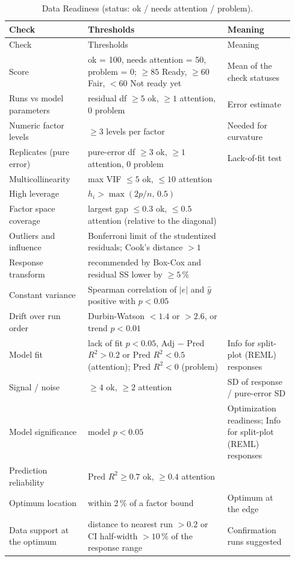 {\small\begin{longtable}{@{}p{0.26\linewidth}p{0.46\linewidth}p{0.22\linewidth}@{}}
\caption{Data Readiness (status: ok / needs attention / problem).}\label{tab:a-const-ready}\\
\toprule
Check & Thresholds & Meaning \\
\midrule
\endfirsthead
\toprule
Check & Thresholds & Meaning \\
\midrule
\endhead
\bottomrule
\endfoot
Score & ok = 100, needs attention = 50, problem = 0; $\ge 85$ Ready, $\ge 60$ Fair, $< 60$ Not ready yet & Mean of
  the check statuses \\
Runs vs model parameters & residual df $\ge 5$ ok, $\ge 1$ attention, 0 problem & Error estimate \\
Numeric factor levels & $\ge 3$ levels per factor & Needed for curvature \\
Replicates (pure error) & pure-error df $\ge 3$ ok, $\ge 1$ attention, 0 problem & Lack-of-fit test \\
Multicollinearity & max VIF $\le 5$ ok, $\le 10$ attention & \\
High leverage & $h_i > \max(2p/n,\,0.5)$ & \\
Factor space coverage & largest gap $\le 0.3$ ok, $\le 0.5$ attention (relative to the diagonal) & \\
Outliers and influence & Bonferroni limit of the studentized residuals; Cook's distance $> 1$ & \\
Response transform & recommended by Box-Cox and residual SS lower by $\ge 5\,\%$ & \\
Constant variance & Spearman correlation of $|e|$ and $\hat y$ positive with $p < 0.05$ & \\
Drift over run order & Durbin-Watson $< 1.4$ or $> 2.6$, or trend $p < 0.01$ & \\
Model fit & lack of fit $p < 0.05$, Adj $-$ Pred $R^2 > 0.2$ or Pred $R^2 < 0.5$ (attention); Pred $R^2 < 0$
  (problem) & Info for split-plot (REML) responses \\
Signal / noise & $\ge 4$ ok, $\ge 2$ attention & SD of response / pure-error SD \\
Model significance & model $p < 0.05$ & Optimization readiness; Info for split-plot (REML) responses \\
Prediction reliability & Pred $R^2 \ge 0.7$ ok, $\ge 0.4$ attention & \\
Optimum location & within 2\,\% of a factor bound & Optimum at the edge \\
Data support at the optimum & distance to nearest run $> 0.2$ or CI half-width $> 10\,\%$ of the response range &
  Confirmation runs suggested \\
\end{longtable}}

